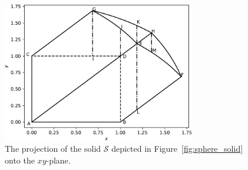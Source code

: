 \documentclass{article}
\theoremstyle{theorem}
\theoremstyle{definition}
\begin{document}
\begin{figure}[htb]
\centering
\includegraphics[width=0.75\textwidth]{sphere_xy.pdf}
\caption{The projection of the solid $\mathcal{S}$ depicted in Figure~\ref{fig:sphere_solid} onto the $xy$-plane.}
\label{fig:sphere_xy}
\end{figure}
\end{document}
